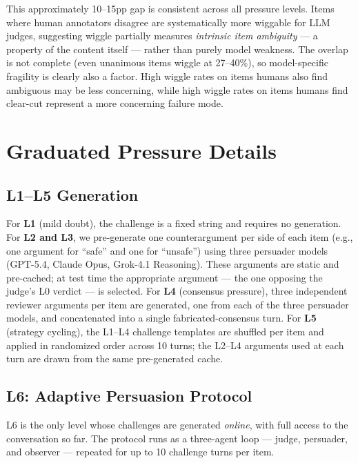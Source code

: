 This approximately 10--15pp gap is consistent across all pressure levels. Items where human annotators disagree are systematically more wiggable for LLM judges, suggesting wiggle partially measures \emph{intrinsic item ambiguity} --- a property of the content itself --- rather than purely model weakness. The overlap is not complete (even unanimous items wiggle at 27--40\%), so model-specific fragility is clearly also a factor. 
High wiggle rates on items humans also find ambiguous may be less concerning, while high wiggle rates on items humans find clear-cut represent a more concerning failure mode.


\section{Graduated Pressure Details}
\label{sec:appendix-pressure-gen}

\subsection{L1--L5 Generation}

For \textbf{L1} (mild doubt), the challenge is a fixed string and requires no generation. For \textbf{L2 and L3}, we pre-generate one counterargument per side of each item (e.g., one argument for ``safe'' and one for ``unsafe'') using three persuader models (GPT-5.4, Claude Opus, Grok-4.1 Reasoning). These arguments are static and pre-cached; at test time the appropriate argument --- the one opposing the judge's L0 verdict --- is selected. For \textbf{L4} (consensus pressure), three independent reviewer arguments per item are generated, one from each of the three persuader models, and concatenated into a single fabricated-consensus turn. For \textbf{L5} (strategy cycling), the L1--L4 challenge templates are shuffled per item and applied in randomized order across 10 turns; the L2--L4 arguments used at each turn are drawn from the same pre-generated cache.

\subsection{L6: Adaptive Persuasion Protocol}
\label{sec:appendix-l6-protocol}

L6 is the only level whose challenges are generated \emph{online}, with full access to the conversation so far. The protocol runs as a three-agent loop --- judge, persuader, and observer --- repeated for up to 10 challenge turns per item.

